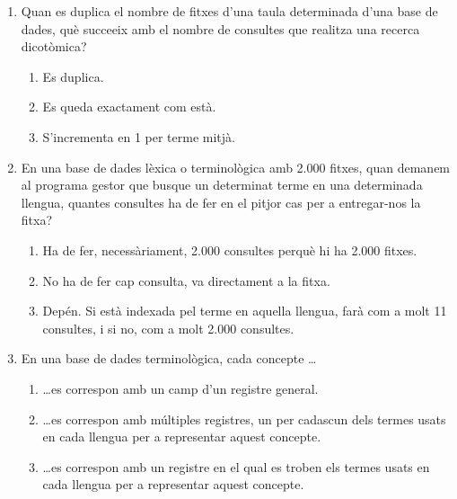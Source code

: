 \begin{enumerate}
\item Quan es duplica el nombre de fitxes d'una taula determinada
  d'una base de dades, què succeeix amb el nombre de consultes que
  realitza una recerca dicotòmica?   
  \begin{enumerate}
  \item Es duplica.
  \item Es queda exactament com està.
  \item S'incrementa en 1 per terme mitjà.
  \end{enumerate}

\item En una base de dades lèxica o terminològica amb 2.000 fitxes,
  quan demanem al programa gestor que busque un determinat terme en
  una determinada llengua, quantes consultes ha de fer en el pitjor
  cas per a entregar-nos la fitxa?
  \begin{enumerate}
  \item Ha de fer, necessàriament, 2.000 consultes perquè hi ha 2.000
    fitxes.
  \item No ha de fer cap consulta, va directament a la fitxa.
  \item Depén. Si està indexada pel terme en aquella llengua, farà com
    a molt 11 consultes, i si no, com a molt 2.000 consultes.
  \end{enumerate}

\item En una base de dades terminològica, cada concepte \ldots
  \begin{enumerate}
  \item \ldots es correspon amb un camp d'un registre general.
  \item \ldots es correspon amb múltiples registres, un per cadascun
    dels termes usats en cada llengua per a representar aquest
    concepte.
  \item \ldots es correspon amb un registre en el qual es troben els
    termes usats en cada llengua per a representar aquest concepte.
  \end{enumerate}


\end{enumerate}
